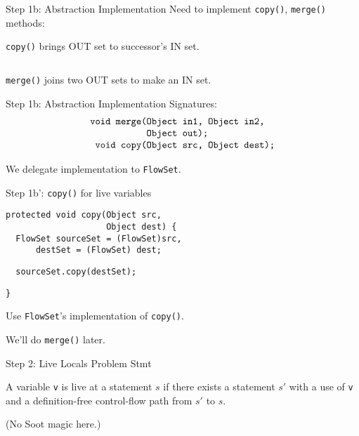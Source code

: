 \begin{slide}{Step 1b: Abstraction Implementation}
Need to implement {\tt copy()}, {\tt merge()} methods:
\begin{center}

\end{center}
{\tt copy()} brings OUT set to successor's IN set.

$\qquad$

\begin{center}

\end{center}
{\tt merge()} joins two OUT sets to make an IN set.
\end{slide}

\begin{slide}{Step 1b: Abstraction Implementation}
Signatures:
{\small 
\[ \mbox{\tt \begin{tabular}{r@{}l}
                 void merge(&Object in1, Object in2,\\
                            &Object out);\\
                 void copy(&Object src, Object dest);
\end{tabular}}\]
}

We delegate implementation to {\tt FlowSet}.
\end{slide}

\begin{slide}{Step 1b': {\tt copy()} for live variables}
\begin{verbatim}
protected void copy(Object src, 
                    Object dest) {
  FlowSet sourceSet = (FlowSet)src,
      destSet = (FlowSet) dest;

\end{verbatim}    
{\red\verb+  sourceSet.copy(destSet);+}
\begin{verbatim}
}
\end{verbatim}

\qquad

Use {\tt FlowSet}'s implementation of {\tt copy()}.

\qquad

We'll do {\tt merge()} later.
\end{slide}

\begin{slide}{Step 2: Live Locals Problem Stmt}

A variable {\tt v} is live at a statement $s$ if there exists
a statement $s'$ with a use of {\tt v} and a
definition-free control-flow path from $s'$ to $s$.

\begin{center}

\end{center}

(No Soot magic here.)

\end{slide}

